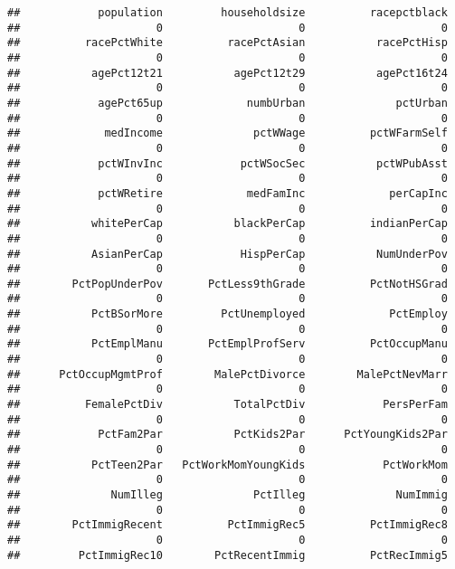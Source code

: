 \documentclass[
]{article}
\begin{document}
\begin{verbatim}
##            population         householdsize          racepctblack 
##                     0                     0                     0 
##          racePctWhite          racePctAsian           racePctHisp 
##                     0                     0                     0 
##           agePct12t21           agePct12t29           agePct16t24 
##                     0                     0                     0 
##            agePct65up             numbUrban              pctUrban 
##                     0                     0                     0 
##             medIncome              pctWWage          pctWFarmSelf 
##                     0                     0                     0 
##            pctWInvInc            pctWSocSec           pctWPubAsst 
##                     0                     0                     0 
##            pctWRetire             medFamInc             perCapInc 
##                     0                     0                     0 
##           whitePerCap           blackPerCap          indianPerCap 
##                     0                     0                     0 
##           AsianPerCap            HispPerCap           NumUnderPov 
##                     0                     0                     0 
##        PctPopUnderPov       PctLess9thGrade          PctNotHSGrad 
##                     0                     0                     0 
##           PctBSorMore         PctUnemployed             PctEmploy 
##                     0                     0                     0 
##           PctEmplManu       PctEmplProfServ          PctOccupManu 
##                     0                     0                     0 
##      PctOccupMgmtProf        MalePctDivorce        MalePctNevMarr 
##                     0                     0                     0 
##          FemalePctDiv           TotalPctDiv            PersPerFam 
##                     0                     0                     0 
##            PctFam2Par           PctKids2Par      PctYoungKids2Par 
##                     0                     0                     0 
##           PctTeen2Par   PctWorkMomYoungKids            PctWorkMom 
##                     0                     0                     0 
##              NumIlleg              PctIlleg              NumImmig 
##                     0                     0                     0 
##        PctImmigRecent          PctImmigRec5          PctImmigRec8 
##                     0                     0                     0 
##         PctImmigRec10        PctRecentImmig          PctRecImmig5 

\end{verbatim}
\end{document}
